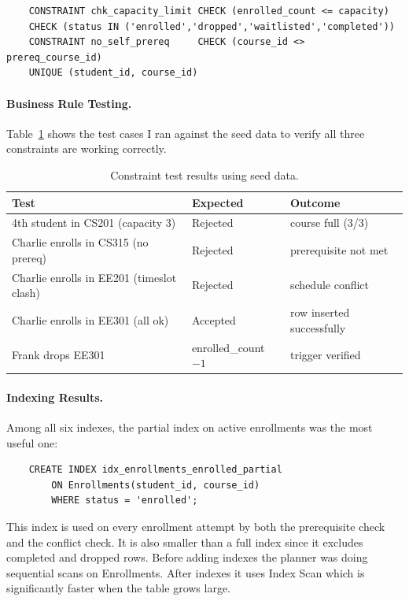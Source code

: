\documentclass[11pt]{article}
\begin{document}
    \begin{verbatim}
    CONSTRAINT chk_capacity_limit CHECK (enrolled_count <= capacity)
    CHECK (status IN ('enrolled','dropped','waitlisted','completed'))
    CONSTRAINT no_self_prereq     CHECK (course_id <> prereq_course_id)
    UNIQUE (student_id, course_id)
    \end{verbatim}

    \paragraph{Business Rule Testing.}
    Table~\ref{tab:tests} shows the test cases I ran against the seed data to verify
    all three constraints are working correctly.

    \begin{table}[h]
    \centering
    \begin{tabular}{lll}
    \toprule
    \textbf{Test} & \textbf{Expected} & \textbf{Outcome} \\
    \midrule
    4th student in CS201 (capacity 3) & Rejected & course full (3/3) \\
    Charlie enrolls in CS315 (no prereq) & Rejected & prerequisite not met \\
    Charlie enrolls in EE201 (timeslot clash) & Rejected & schedule conflict \\
    Charlie enrolls in EE301 (all ok) & Accepted & row inserted successfully \\
    Frank drops EE301 & enrolled\_count $-1$ & trigger verified \\
    \bottomrule
    \end{tabular}
    \caption{Constraint test results using seed data.}
    \label{tab:tests}
    \end{table}

    \paragraph{Indexing Results.}
    Among all six indexes, the partial index on active enrollments was the most useful
    one:

    \begin{verbatim}
    CREATE INDEX idx_enrollments_enrolled_partial
        ON Enrollments(student_id, course_id)
        WHERE status = 'enrolled';
    \end{verbatim}

    This index is used on every enrollment attempt by both the prerequisite check and
    the conflict check. It is also smaller than a full index since it excludes
    completed and dropped rows. Before adding indexes the planner was doing sequential
    scans on Enrollments. After indexes it uses Index Scan which is significantly faster
    when the table grows large.
\end{document}
